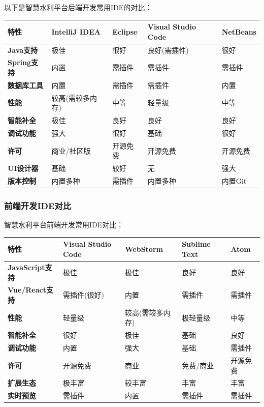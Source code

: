 以下是智慧水利平台后端开发常用IDE的对比：

\begin{longtable}[]{@{}lllll@{}}
\toprule\noalign{}
特性 & IntelliJ IDEA & Eclipse & Visual Studio Code & NetBeans \\
\midrule\noalign{}
\endhead
\bottomrule\noalign{}
\endlastfoot
\textbf{Java支持} & 极佳 & 很好 & 良好(需插件) & 很好 \\
\textbf{Spring支持} & 内置 & 需插件 & 需插件 & 需插件 \\
\textbf{数据库工具} & 内置 & 需插件 & 需插件 & 内置 \\
\textbf{性能} & 较高(需较多内存) & 中等 & 轻量级 & 中等 \\
\textbf{智能补全} & 极佳 & 良好 & 良好 & 良好 \\
\textbf{调试功能} & 强大 & 很好 & 基础 & 很好 \\
\textbf{许可} & 商业/社区版 & 开源免费 & 开源免费 & 开源免费 \\
\textbf{UI设计器} & 基础 & 较好 & 无 & 强大 \\
\textbf{版本控制} & 内置多种 & 需插件 & 内置多种 & 内置Git \\
\end{longtable}

\subsubsection{前端开发IDE对比}\label{ux524dux7aefux5f00ux53d1ideux5bf9ux6bd4}

智慧水利平台前端开发常用IDE对比：

\begin{longtable}[]{@{}lllll@{}}
\toprule\noalign{}
特性 & Visual Studio Code & WebStorm & Sublime Text & Atom \\
\midrule\noalign{}
\endhead
\bottomrule\noalign{}
\endlastfoot
\textbf{JavaScript支持} & 极佳 & 极佳 & 良好 & 良好 \\
\textbf{Vue/React支持} & 需插件(很好) & 内置 & 需插件 & 需插件 \\
\textbf{性能} & 轻量级 & 较高(需较多内存) & 极轻量级 & 中等 \\
\textbf{智能补全} & 很好 & 极佳 & 基础 & 良好 \\
\textbf{调试功能} & 内置 & 强大 & 基础 & 需插件 \\
\textbf{许可} & 开源免费 & 商业 & 免费/商业 & 开源免费 \\
\textbf{扩展生态} & 极丰富 & 较丰富 & 丰富 & 丰富 \\
\textbf{实时预览} & 需插件 & 内置 & 需插件 & 需插件 \\
\end{longtable}

